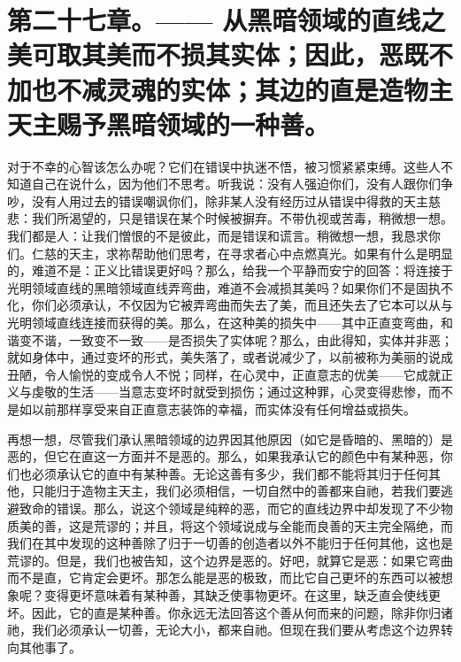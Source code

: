 
\section{第二十七章。—— 从黑暗领域的直线之美可取其美而不损其实体；因此，恶既不加也不减灵魂的实体；其边的直是造物主天主赐予黑暗领域的一种善。}

对于不幸的心智该怎么办呢？它们在错误中执迷不悟，被习惯紧紧束缚。这些人不知道自己在说什么，因为他们不思考。听我说：没有人强迫你们，没有人跟你们争吵，没有人用过去的错误嘲讽你们，除非某人没有经历过从错误中得救的天主慈悲：我们所渴望的，只是错误在某个时候被摒弃。不带仇视或苦毒，稍微想一想。我们都是人：让我们憎恨的不是彼此，而是错误和谎言。稍微想一想，我恳求你们。仁慈的天主，求祢帮助他们思考，在寻求者心中点燃真光。如果有什么是明显的，难道不是：正义比错误更好吗？那么，给我一个平静而安宁的回答：将连接于光明领域直线的黑暗领域直线弄弯曲，难道不会减损其美吗？如果你们不是固执不化，你们必须承认，不仅因为它被弄弯曲而失去了美，而且还失去了它本可以从与光明领域直线连接而获得的美。那么，在这种美的损失中——其中正直变弯曲，和谐变不谐，一致变不一致——是否损失了实体呢？那么，由此得知，实体并非恶；就如身体中，通过变坏的形式，美失落了，或者说减少了，以前被称为美丽的说成丑陋，令人愉悦的变成令人不悦；同样，在心灵中，正直意志的优美——它成就正义与虔敬的生活——当意志变坏时就受到损伤；通过这种罪，心灵变得悲惨，而不是如以前那样享受来自正直意志装饰的幸福，而实体没有任何增益或损失。\par

再想一想，尽管我们承认黑暗领域的边界因其他原因（如它是昏暗的、黑暗的）是恶的，但它在直这一方面并不是恶的。那么，如果我承认它的颜色中有某种恶，你们也必须承认它的直中有某种善。无论这善有多少，我们都不能将其归于任何其他，只能归于造物主天主，我们必须相信，一切自然中的善都来自祂，若我们要逃避致命的错误。那么，说这个领域是纯粹的恶，而它的直线边界中却发现了不少物质美的善，这是荒谬的；并且，将这个领域说成与全能而良善的天主完全隔绝，而我们在其中发现的这种善除了归于一切善的创造者以外不能归于任何其他，这也是荒谬的。但是，我们也被告知，这个边界是恶的。好吧，就算它是恶：如果它弯曲而不是直，它肯定会更坏。那怎么能是恶的极致，而比它自己更坏的东西可以被想象呢？变得更坏意味着有某种善，其缺乏使事物更坏。在这里，缺乏直会使线更坏。因此，它的直是某种善。你永远无法回答这个善从何而来的问题，除非你归诸祂，我们必须承认一切善，无论大小，都来自祂。但现在我们要从考虑这个边界转向其他事了。\par


